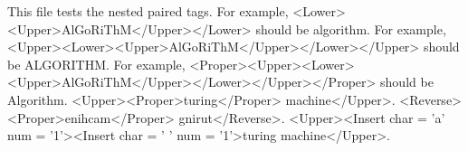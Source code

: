 This file tests the nested paired tags.
For example, <Lower><Upper>AlGoRiThM</Upper></Lower> should be algorithm.
For example, <Upper><Lower><Upper>AlGoRiThM</Upper></Lower></Upper> should be ALGORITHM.
For example, <Proper><Upper><Lower><Upper>AlGoRiThM</Upper></Lower></Upper></Proper> should be Algorithm.
<Upper><Proper>turing</Proper> machine</Upper>.
<Reverse><Proper>enihcam</Proper> gnirut</Reverse>.
<Upper><Insert char = 'a' num = '1'><Insert char = ' ' num = '1'>turing machine</Upper>.
